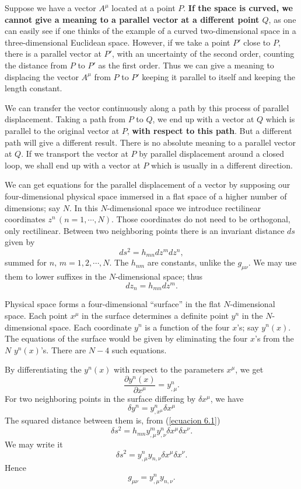 
Suppose we have a vector $A^\mu$ located at a point $P$. \textbf{If the space is 
curved, we cannot give a meaning to a parallel vector at a different point $Q$}, 
as one can easily see if one thinks of the example of a curved two-dimensional 
space in a three-dimensional Euclidean space. However, if we take a point $P'$ 
close to $P$, there is a parallel vector at $P'$, with an uncertainty of the 
second order, counting the distance from $P$ to $P'$ as the first order. Thus we 
can give a meaning to displacing the vector $A^\mu$ from $P$ to $P'$ keeping it 
parallel to itself and keeping the length constant.

We can transfer the vector continuously along a path by this process of 
parallel displacement. Taking a path from $P$ to $Q$, we end up with a vector at 
$Q$ which is parallel to the original vector at $P$, \textbf{with respect to 
this path}. But a different path will give a different result. There is no 
absolute meaning to a parallel vector at $Q$. If we transport the vector at $P$ 
by parallel displacement around a closed loop, we shall end up with a vector at 
$P$ which is usually in a different direction.

We can get equations for the parallel displacement of a vector by supposing our 
four-dimensional physical space immersed in a flat space of a higher number of 
dimensions; say $N$. In this $N$-dimensional space we introduce rectilinear 
coordinates $z^n\,(n=1,\cdots, N)$. Those coordinates do not need to be 
orthogonal, only rectilinear. Between two neighboring points there is an 
invariant distance $ds$ given by 
\begin{equation}
 \label{ecuacion 6.1}
 ds^2 = h_{mn} dz^m dz^n ,
\end{equation}
summed for $n,\,m = 1,2,\cdots, N$. The $h_{nm}$ are constants, unlike the 
$g_{\mu\nu}$. We may use them to lower suffixes in the $N$-dimensional space; 
thus
\[
 dz_n = h_{mn} dz^m.
\]

Physical space forms a four-dimensional ``surface'' in the flat $N$-dimensional 
space. Each point $x^\mu$ in the surface determines a definite point $y^n$ in 
the $N$-dimensional space. Each coordinate $y^n$ is a function of the four 
$x$'s; say $y^n(x)$. The equations of the surface would be given by eliminating 
the four $x$'s from the $N$ $y^n(x)$'s. There are $N-4$ such equations.

By differentiating the $y^n(x)$ with respect to the parameters $x^\mu$, we get
\[
 \frac{\partial y^n(x)}{\partial x^\mu} = y^n_{,\mu}.
\]
For two neighboring points in the surface differing by $\delta x^\mu$, we have
\begin{equation}
 \label{ecuacion 6.2}
 \delta y^n = y^n_{,x^\mu} \delta x^\mu
\end{equation}
The squared distance between them is, from (\ref{ecuacion 6.1})
\[
 \delta s^2 = h_{mn}  y^m_{,\mu}  y^n_{,\nu} \delta x^\mu \delta x^\nu.
\]
We may write it 
\[
 \delta s^2 = y^n_{,\mu} y_{n,\nu} \delta x^\mu \delta x^\nu.
\]
Hence
\begin{equation}
 \label{ecuacion 6.3}
 g_{\mu\nu} = y^n_{,\mu} y_{n,\nu}.
\end{equation}

